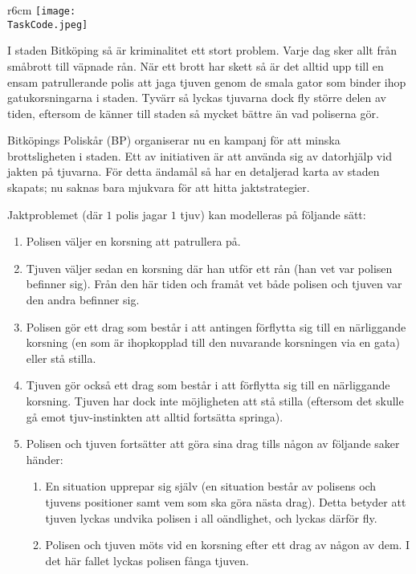\documentclass{boi2014-se}
\renewcommand{\TaskCode}{coprobber}
\begin{document}
    \begin{wrapfigure}[8]{r}{6cm}
        \vspace{-24pt}
		\texttt{[image: \\TaskCode.jpeg]}
	\end{wrapfigure}

    I staden Bitköping så är kriminalitet ett stort problem.
    Varje dag sker allt från småbrott till väpnade rån.
    När ett brott har skett så är det alltid upp till en ensam patrullerande polis
    att jaga tjuven genom de smala gator som binder ihop gatukorsningarna i staden.
    Tyvärr så lyckas tjuvarna dock fly större delen av tiden, eftersom de känner till
    staden så mycket bättre än vad poliserna gör.

    Bitköpings Poliskår (BP) organiserar nu en kampanj för att minska brottsligheten i staden.
    Ett av initiativen är att använda sig av datorhjälp vid jakten på tjuvarna.
    För detta ändamål så har en detaljerad karta av staden skapats; nu saknas bara mjukvara för att hitta jaktstrategier.

    Jaktproblemet (där $1$ polis jagar $1$ tjuv) kan modelleras på följande sätt:
    \begin{enumerate}
        \item Polisen väljer en korsning att patrullera på.
        \item Tjuven väljer sedan en korsning där han utför ett rån (han
            vet var polisen befinner sig). Från den här tiden och framåt vet
            både polisen och tjuven var den andra befinner sig.
        \item Polisen gör ett drag som består i att antingen förflytta sig
            till en närliggande korsning (en som är ihopkopplad till den
            nuvarande korsningen via en gata) eller stå stilla.
        \item Tjuven gör också ett drag som består i att förflytta sig till
            en närliggande korsning. Tjuven har dock inte möjligheten att
            stå stilla (eftersom det skulle gå emot tjuv-instinkten att
            alltid fortsätta springa).
        \item Polisen och tjuven fortsätter att göra sina drag tills någon
            av följande saker händer:
        \begin{enumerate}
            \item En situation upprepar sig själv (en situation består av
                polisens och tjuvens positioner samt vem som ska göra nästa
                drag). Detta betyder att tjuven lyckas undvika polisen i all
                oändlighet, och lyckas därför fly.
            \item Polisen och tjuven möts vid en korsning efter ett drag av
                någon av dem. I det här fallet lyckas polisen fånga tjuven.        
        \end{enumerate}
    \end{enumerate}
\end{document}
